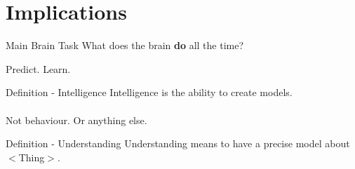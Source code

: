 \section{Implications}


\begin{frame}[c]{Main Brain Task}
    \pause
    \Huge
    What does the brain \textbf{do} \newline all the time?

    \vfill

    \pause
    Predict. \pause Learn.
\end{frame}


\begin{frame}[c]{Definition - Intelligence}
    \Large
    Intelligence \pause is the ability to create models. \\ \\ \pause
    Not behaviour. Or anything else.
\end{frame}

\begin{frame}[c]{Definition - Understanding}
    \Large
    Understanding \pause means to have a precise model about $<$Thing$>$.
\end{frame}

